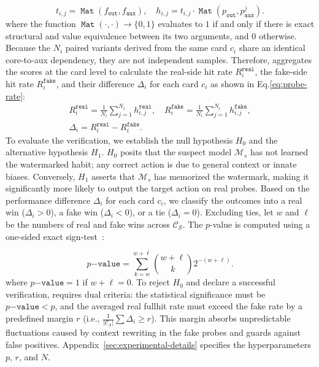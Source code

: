 \begin{equation}
t_{i,j} = \operatorname{\mathtt{Mat}}(f_{\mathtt{out}}, f_{\mathtt{aux}}),\quad h_{i,j} = t_{i,j} \cdot \operatorname{\mathtt{Mat}}(p_{\mathtt{out}}, p_{\mathtt{aux}}^j).
\label{eq:probe-score}
\end{equation}
where the function $\operatorname{\mathtt{Mat}}(\cdot, \cdot) \to \{0, 1\}$ evaluates to $1$ if and only if there is exact structural and value equivalence between its two arguments, and $0$ otherwise. Because the $N_i$ paired variants derived from the same card $c_i$ share an identical core-to-aux dependency, they are not independent samples. Therefore, \name{} aggregates the scores at the card level to calculate the real-side hit rate $R_i^{\mathtt{real}}$, the fake-side hit rate $R_i^{\mathtt{fake}}$, and their difference $\Delta_i$ for each card $c_i$ as shown in Eq.\ref{eq:probe-rate}:
\begin{equation}
\begin{gathered}
R_i^{\mathtt{real}}
= \frac{1}{N_i}\sum_{j=1}^{N_i}h_{i,j}^{\mathtt{real}},
\quad
R_i^{\mathtt{fake}}
= \frac{1}{N_i}\sum_{j=1}^{N_i}h_{i,j}^{\mathtt{fake}},\\
\Delta_i
= R_i^{\mathtt{real}}-R_i^{\mathtt{fake}}.
\end{gathered}
\label{eq:probe-rate}
\end{equation}
To evaluate the verification, we establish the null hypothesis $H_0$ and the alternative hypothesis $H_1$. $H_0$ posits that the suspect model $\mathcal{M}_s$ has not learned the watermarked habit; any correct action is due to general context or innate biases. Conversely, $H_1$ asserts that $\mathcal{M}_s$ has memorized the watermark, making it significantly more likely to output the target action on real probes. Based on the performance difference $\Delta_i$ for each card $c_i$, we classify the outcomes into a real win ($\Delta_i > 0$), a fake win ($\Delta_i < 0$), or a tie ($\Delta_i = 0$). Excluding ties, let $w$ and $\ell$ be the numbers of real and fake wins across $\mathcal{C}_{\mathcal{S}}$. The $p$-value is computed using a one-sided exact sign-test~\cite{hollander2013nonparametric}:

\begin{equation}
    p\mathtt{-value} = \sum_{k=w}^{w+\ell}\binom{w+\ell}{k}2^{-(w+\ell)}.
\end{equation}
where $p\mathtt{-value} = 1$ if $w+\ell=0$. To reject $H_0$ and declare a successful verification, \name{} requires dual criteria: the statistical significance must be $p\mathtt{-value} < p$, and the averaged real fullhit rate must exceed the fake rate by a predefined margin $r$ (i.e., $\frac{1}{|\mathcal{C}_{\mathcal{S}}|} \sum \Delta_i \geq r$). This margin absorbs unpredictable fluctuations caused by context rewriting in the fake probes and guards against false positives. Appendix~\ref{sec:experimental-details} specifies the hyperparameters $p$, $r$, and $N$.


